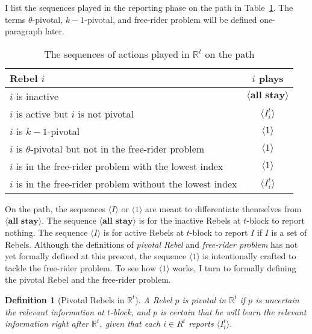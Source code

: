 \documentclass[12pt,letter]{article}
\newcommand{\Omicron}{\mathbb{R}}
\newtheorem{definition}{Definition}[section]
\theoremstyle{definition}
\theoremstyle{remark}
\theoremstyle{claim}
\begin{document}
I list the sequences played in the reporting phase on the path in Table~\ref{Table_msg_RP_path}. The terms $\theta$-pivotal, $k-1$-pivotal, and free-rider problem will be defined one-paragraph later.

\begin{table}[!htbp]
\caption{The sequences of actions played in $\Omicron^t$ on the path}
\label{Table_msg_RP_path}
\begin{center}
\begin{tabular}{l c}
Rebel $i$ & $i$ plays\\
\hline
\hline
$i$ is inactive				& $\langle \textbf{all stay} \rangle$  \\
$i$ is active but $i$ is not pivotal	 					 			& $\langle I^t_i \rangle$  \\
$i$ is $k-1$-pivotal	 					 			& $\langle 1 \rangle$  \\
$i$ is $\theta$-pivotal but not in the free-rider problem	 					 			& $\langle 1 \rangle$  \\
$i$ is in the free-rider problem with the lowest index	 					 			& $\langle 1 \rangle$  \\
$i$ is in the free-rider problem without the lowest index	 					 			& $\langle I^t_i \rangle$  \\
\hline
\end{tabular}
\end{center}
\end{table}

On the path, the sequences $\langle I \rangle$ or $\langle 1 \rangle$ are meant to differentiate themselves from $\langle \textbf{all stay} \rangle$. The sequence $\langle \textbf{all stay} \rangle$ is for the inactive Rebels at $t$-block to report nothing. The sequence $\langle I \rangle$ is for active Rebels at $t$-block to report $I$ if $I$ is a set of Rebels. Although the definitions of \textit{pivotal Rebel} and \textit{free-rider problem} has not yet formally defined at this present, the sequence $\langle 1 \rangle$ is intentionally crafted to tackle the free-rider problem. To see how $\langle 1 \rangle$ works, I turn to formally defining the {pivotal Rebel} and the {free-rider problem}. 

\begin{definition}[Pivotal Rebels in $\Omicron^t$]
A Rebel $p$ is pivotal in $\Omicron^t$ if $p$ is uncertain the relevant information at $t$-block, and $p$ is certain that he will learn the relevant information right after $\Omicron^t$, given that each $i\in R^t$ reports $\langle I^t_i \rangle$.
\end{definition}
\end{document}
